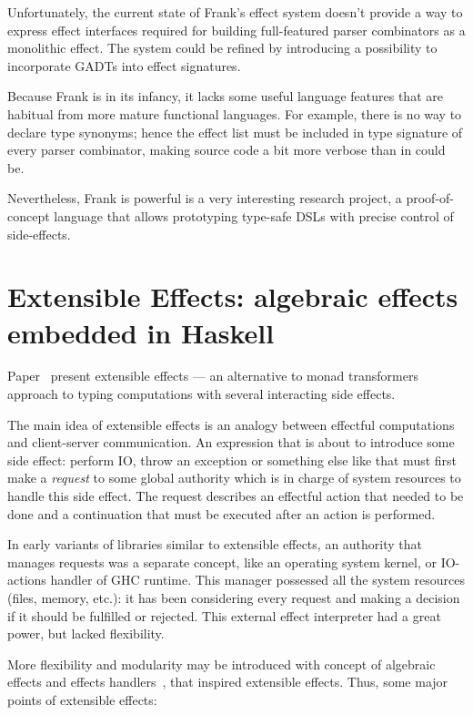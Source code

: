     Unfortunately, the current state of Frank's effect system doesn't provide a way
    to express effect interfaces required for building full-featured parser combinators
    as a monolithic effect. The system could be refined by introducing a possibility
    to incorporate GADTs into effect signatures.

    Because Frank is in its infancy, it lacks some useful language features that
    are habitual from more mature functional languages. For example, there is no
    way to declare type synonyms; hence the
    effect list must be included in type signature of every parser combinator, making
    source code a bit more verbose than in could be.

    Nevertheless, Frank is powerful is a very interesting research project, a
    proof-of-concept language that allows prototyping type-safe DSLs with precise
    control of side-effects.

    \section{Extensible Effects: algebraic effects embedded in Haskell}

    Paper~\cite{Kiselyov:2013:EEA:2578854.2503791} present extensible effects ---
    an alternative to monad transformers
    approach to typing computations with several interacting side effects.

    The main idea of extensible effects is an analogy between effectful computations and
    client-server communication. An expression that is about to introduce some side effect:
    perform IO, throw an exception or something else like that must first make a \emph{request}
    to some global authority which is in charge of system resources to handle this side effect.
    The request describes an effectful action that needed to be done and a continuation that
    must be executed after an action is performed.

    In early variants of libraries similar to extensible effects, an authority that manages
    requests was a separate concept, like an operating system kernel, or IO-actions
    handler of GHC runtime. This manager possessed all the system resources (files,
    memory, etc.): it has been considering every request and making a decision if it should be
    fulfilled or rejected. This external effect interpreter had a great power, but lacked
    flexibility.

    More flexibility and modularity may be introduced with concept of algebraic effects and
    effects handlers~\cite{DBLP:journals/jlp/BauerP15}, that inspired extensible effects.
    Thus, some major points of extensible effects:

